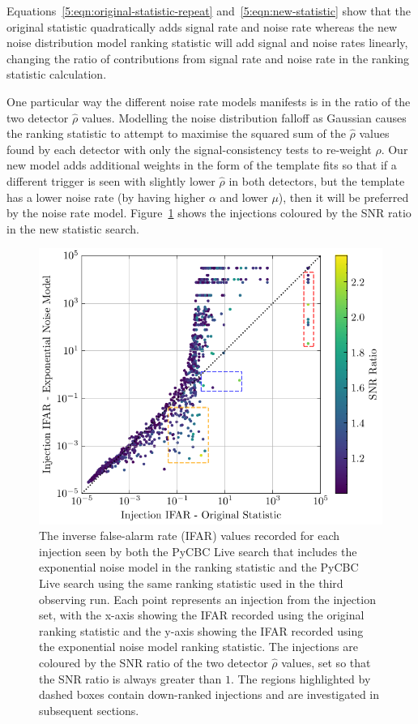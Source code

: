 Equations~\ref{5:eqn:original-statistic-repeat} and~\ref{5:eqn:new-statistic} show that the original statistic quadratically adds signal rate and noise rate whereas the new noise distribution model ranking statistic will add signal and noise rates linearly, changing the ratio of contributions from signal rate and noise rate in the ranking statistic calculation.

One particular way the different noise rate models manifests is in the ratio of the two detector $\hat{\rho}$ values. Modelling the noise distribution falloff as Gaussian causes the ranking statistic to attempt to maximise the squared sum of the $\hat{\rho}$ values found by each detector with only the signal-consistency tests to re-weight $\rho$. Our new model adds additional weights in the form of the template fits so that if a different trigger is seen with slightly lower $\hat{\rho}$ in both detectors, but the template has a lower noise rate (by having higher $\alpha$ and lower $\mu$), then it will be preferred by the noise rate model. Figure~\ref{5:fig:ifar-ifar-snr-ratio} shows the injections coloured by the SNR ratio in the new statistic search.
%
\begin{figure}
  \centering
  \begin{minipage}[t]{1.0\linewidth}
    \includegraphics[width=1\textwidth]{images/5_pycbclive/plots/fits_only_ifar_vs_ifar_regions_snr_ratio.pdf}
  \end{minipage}
  \caption{The inverse false-alarm rate (IFAR) values recorded for each injection seen by both the PyCBC Live search that includes the exponential noise model in the ranking statistic and the PyCBC Live search using the same ranking statistic used in the third observing run. Each point represents an injection from the injection set, with the x-axis showing the IFAR recorded using the original ranking statistic and the y-axis showing the IFAR recorded using the exponential noise model ranking statistic. The injections are coloured by the SNR ratio of the two detector $\hat{\rho}$ values, set so that the SNR ratio is always greater than $1$. The regions highlighted by dashed boxes contain down-ranked injections and are investigated in subsequent sections.}
  \label{5:fig:ifar-ifar-snr-ratio}
\end{figure}
